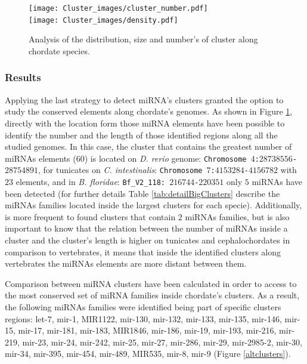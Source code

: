 \documentclass[11pt]{article}
\begin{document}
\begin{figure}[ht]
\centering
\texttt{[image: Cluster\_images/cluster\_number.pdf]} \\ 
\texttt{[image: Cluster\_images/density.pdf]} 
\caption{Analysis of the distribution, size and number's of cluster along chordate species.}
\label{fig:sizeCluster}
\end{figure}

\newpage


\subsubsection*{Results}


Applying the last strategy to detect miRNA's clusters granted the option to study the conserved elements along chordate's genomes. As shown in Figure \ref{fig:sizeCluster}, directly with the location form those miRNA elements have been possible to identify the number and the length of those identified regions along all the studied genomes. In this case, the cluster that contains the greatest number of miRNAs elements ($60$) is located on \textit{D. rerio} genome: \texttt{Chromosome $4$:$28738556$-$28754891$}, for tunicates on \textit{C. intestinalis}: \texttt{Chromosome $7$:$4153284$-$4156782$} with $23$ elements, and in \textit{B. floridae}: \texttt{Bf\_V2\_118: $216744$-$220351$} only $5$ miRNAs have been detected (for further details Table \ref{tab:detailBigClusters} describe the miRNAs families located inside the largest clusters for each specie). Additionally, is more frequent to found clusters that contain $2$ miRNAs families, but is also important to know that the relation between the number of miRNAs inside a cluster and the cluster's length is higher on tunicates and cephalochordates in comparison to vertebrates, it means that inside the identified clusters along vertebrates the miRNAs elements are more distant between them. 


Comparison between miRNA clusters have been calculated in order to access to the 
most conserved set of miRNA families inside chordate's clusters. As a result, the following miRNAs families were identified being part of specific clusters regions: let-7, mir-1, 
MIR1122, mir-130, mir-132, mir-133, mir-135, mir-146, mir-15, mir-17, mir-181, 
mir-183, MIR1846, mir-186, mir-19, mir-193, mir-216, mir-219, mir-23, mir-24, 
mir-242, mir-25, mir-27, mir-286, mir-29, mir-2985-2, mir-30, mir-34, mir-395, 
mir-454, mir-489, MIR535, mir-8, mir-9 (Figure \ref{altclusters}).



\newpage


\end{document}
